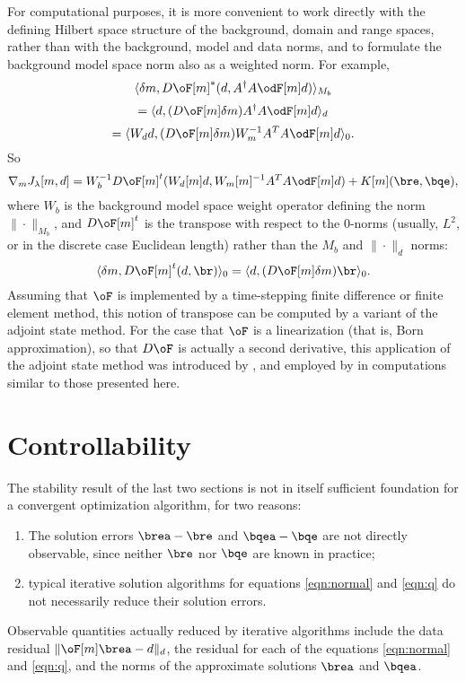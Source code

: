 \begin{rem} For computational purposes, it is more convenient to work
directly with the defining Hilbert space structure of the background, domain and
range spaces, rather than with the background, model and data norms, and to
formulate the background model space norm also as a weighted norm. For example,
\[
\langle \delta m, D\oF[m]^*(d,A^{\dagger}A\odF[m]d) \rangle_{M_b}
\]
\[
= \langle d, (D\oF[m]\delta m)A^{\dagger}A\odF[m]d \rangle_d 
\]
\[
= \langle W_d d, (D\oF[m]\delta m)W_m^{-1}A^TA\odF[m]d \rangle_0.
\]
So
\begin{equation}
\label{eqn:thm1b}
\nabla_m J_{\lambda}[m,d] = W_b^{-1}D\oF[m]^t(W_d[m]d,W_m[m]^{-1}A^TA\odF[m]d) +
K[m](\bre,\bqe),
\end{equation}
where $W_b$ is the background model space weight operator defining the
norm $\|\cdot\|_{M_b}$, and $D\oF[m]^t$ is the transpose with respect
to the 0-norms (usually, $L^2$, or in the discrete case Euclidean
length) rather than the $M_b$ and $\|\cdot\|_d$ norms:
\begin{equation}
\label{eqn:dual0}
\langle \delta m, D\oF[m]^t(d,\br)\rangle_0 = \langle d,
(D\oF[m]\delta m)\br\rangle_0.
\end{equation}
Assuming that $\oF$ is implemented by a time-stepping finite
difference or finite element method, this notion of transpose can be
computed by a variant of the adjoint state method. For the case that
$\oF$ is a linearization (that is, Born approximation), so
that $D\oF$ is actually a second derivative, this
application of the adjoint state method was introduced by
\cite{SymSant:88}, and employed by \cite{KerSy:94} in computations
similar to those presented here.
\end{rem}

\section{Controllability}
The stability result of the last two sections is not in itself
sufficient foundation for a convergent optimization
algorithm, for two reasons: 
\begin{enumerate}
\item The solution errors $\brea-\bre$ and $\bqea-\bqe$ are not
directly observable, since neither $\bre$ nor $\bqe$ are known in
practice;
\item typical iterative solution algorithms for
equations \ref{eqn:normal} and \ref{eqn:q} do not necessarily reduce
their solution errors.
\end{enumerate}
Observable quantities actually reduced by iterative algorithms include the
data residual $\|\oF[m]\brea - d\|_d$, the residual for each of the
equations \ref{eqn:normal} and \ref{eqn:q}, and the norms of the
approximate solutions $\brea$ and $\bqea$.

